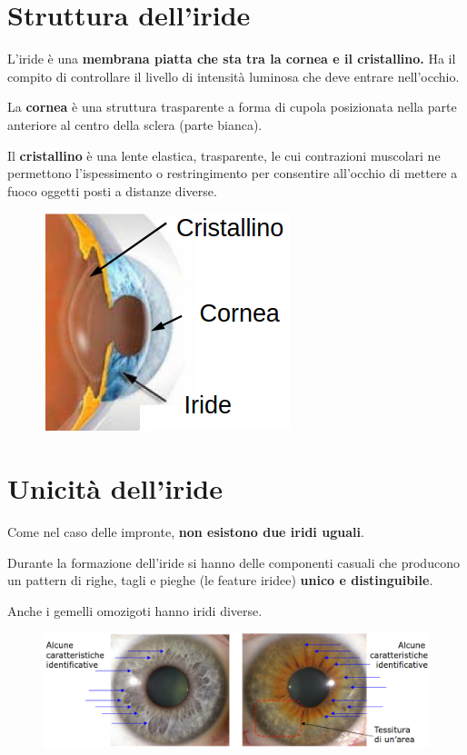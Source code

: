 \documentclass{report}
\begin{document}
\section{Struttura dell'iride}
L'iride è una \textbf{membrana piatta che sta tra la cornea e il cristallino.}
Ha il compito di controllare il livello di intensità luminosa che deve entrare nell'occhio.

La \textbf{cornea} è una struttura trasparente a forma di cupola 
posizionata nella parte anteriore al centro della sclera (parte bianca).

Il \textbf{cristallino} è una lente elastica, trasparente, le cui contrazioni muscolari ne 
permettono l'ispessimento o restringimento per consentire all'occhio di mettere a fuoco oggetti 
posti a distanze diverse.

\begin{figure}[ht]
    \centering
    \includegraphics[width=0.4\linewidth]{images/struttura-iride.png}
\end{figure}

\section{Unicità dell'iride}

Come nel caso delle impronte, \textbf{non esistono due iridi uguali}.

\noindent Durante la formazione dell'iride si hanno delle componenti casuali che 
producono un pattern di righe, tagli e pieghe (le feature iridee) \textbf{unico
e distinguibile}.

\noindent Anche i gemelli omozigoti hanno iridi diverse.

\begin{figure}[ht]
    \centering
    \includegraphics[width=1\linewidth]{images/unicita.png}
\end{figure}
\end{document}
